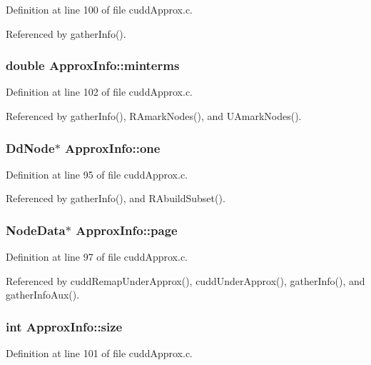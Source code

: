 Definition at line 100 of file cudd\-Approx.c.

Referenced by gather\-Info().
\subsubsection{\setlength{\rightskip}{0pt plus 5cm}double \bf{Approx\-Info::minterms}}\label{structApproxInfo_fc0231f49dc301ed49ee1c6edd101027}




Definition at line 102 of file cudd\-Approx.c.

Referenced by gather\-Info(), RAmark\-Nodes(), and UAmark\-Nodes().
\subsubsection{\setlength{\rightskip}{0pt plus 5cm}\bf{Dd\-Node}$\ast$ \bf{Approx\-Info::one}}\label{structApproxInfo_0049d9611a8a8c345b59edc143eaeb44}




Definition at line 95 of file cudd\-Approx.c.

Referenced by gather\-Info(), and RAbuild\-Subset().
\subsubsection{\setlength{\rightskip}{0pt plus 5cm}\bf{Node\-Data}$\ast$ \bf{Approx\-Info::page}}\label{structApproxInfo_085bd3f7942294ed7564c634764657e2}




Definition at line 97 of file cudd\-Approx.c.

Referenced by cudd\-Remap\-Under\-Approx(), cudd\-Under\-Approx(), gather\-Info(), and gather\-Info\-Aux().
\subsubsection{\setlength{\rightskip}{0pt plus 5cm}int \bf{Approx\-Info::size}}\label{structApproxInfo_b28cbfc03924ff606061482ef125b8a8}




Definition at line 101 of file cudd\-Approx.c.


